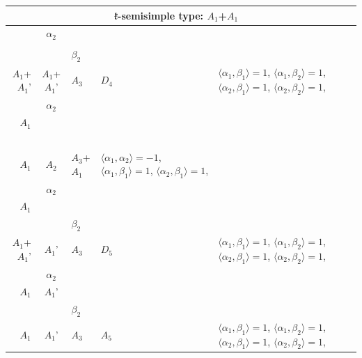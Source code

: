 \documentclass[12pt]{report}
\begin{document}
\begin{appendix}
{\begin{longtable}{rcl p{1cm}p{1cm}p{3cm} }
\\
\hline\multicolumn{5}{c}{$\mathfrak{k}$-semisimple type: $A_1$+$A_1$}\\
\hline\hline\begin{tabular}{cc}$\alpha_1$+ & $\alpha_2$\\\tiny{  } & \tiny{  }\end{tabular} &\begin{tabular}{c} = \\~ \end{tabular} & \begin{tabular}{cc}$\beta_1$+ & $\beta_2$\\\tiny{ $A_1$+$A_1$' } & \tiny{ $A_1$+$A_1$' }\end{tabular} & $A_3$ & $D_4$ &  $\langle\alpha_1, \beta_1\rangle=1$, $\langle\alpha_1, \beta_2\rangle=1$, $\langle\alpha_2, \beta_1\rangle=1$, $\langle\alpha_2, \beta_2\rangle=1$, 
\\
\begin{tabular}{cc}$\alpha_1$+ & $\alpha_2$\\\tiny{ $A_1$ } & \tiny{  }\end{tabular} &\begin{tabular}{c} = \\~ \end{tabular} & \begin{tabular}{c}$\beta_1$\\\tiny{ $A_1$ }\end{tabular} & $A_2$ & $A_3$+$A_1$ & $\langle\alpha_1, \alpha_2\rangle=-1$,  $\langle\alpha_1, \beta_1\rangle=1$, $\langle\alpha_2, \beta_1\rangle=1$, 
\\
\begin{tabular}{cc}$\alpha_1$+ & $\alpha_2$\\\tiny{ $A_1$ } & \tiny{  }\end{tabular} &\begin{tabular}{c} = \\~ \end{tabular} & \begin{tabular}{cc}$\beta_1$+ & $\beta_2$\\\tiny{ $A_1$+$A_1$' } & \tiny{ $A_1$' }\end{tabular} & $A_3$ & $D_5$ &  $\langle\alpha_1, \beta_1\rangle=1$, $\langle\alpha_1, \beta_2\rangle=1$, $\langle\alpha_2, \beta_1\rangle=1$, $\langle\alpha_2, \beta_2\rangle=1$, 
\\
\begin{tabular}{cc}$\alpha_1$+ & $\alpha_2$\\\tiny{ $A_1$ } & \tiny{ $A_1$' }\end{tabular} &\begin{tabular}{c} = \\~ \end{tabular} & \begin{tabular}{cc}$\beta_1$+ & $\beta_2$\\\tiny{ $A_1$ } & \tiny{ $A_1$' }\end{tabular} & $A_3$ & $A_5$ &  $\langle\alpha_1, \beta_1\rangle=1$, $\langle\alpha_1, \beta_2\rangle=1$, $\langle\alpha_2, \beta_1\rangle=1$, $\langle\alpha_2, \beta_2\rangle=1$, 

\end{longtable}}
\end{appendix}
\end{document}
